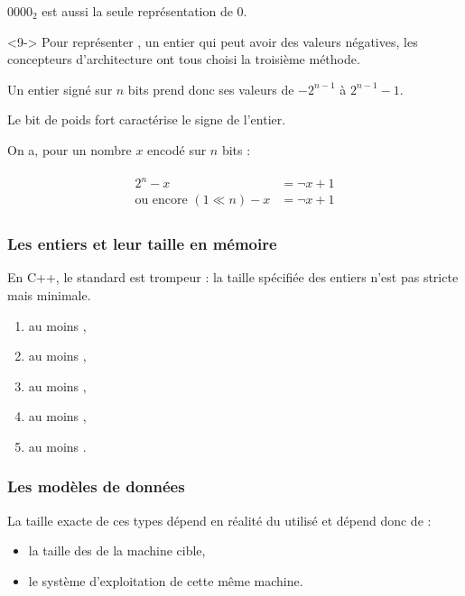 \documentclass{cppcourses}
\begin{document}
\begin{frame}
\begin{enumerate}
\begin{onlyenv}
\( {0000}_2 \) est aussi la seule représentation de 0.
\end{onlyenv}

\end{enumerate}

\begin{onlyenv}<9->
Pour représenter , un entier qui peut avoir des valeurs négatives, les concepteurs d'architecture ont tous choisi la troisième méthode.

Un entier signé sur \( n \) bits prend donc ses valeurs de \( -2^{n - 1} \) à \( 2^{n - 1} - 1\).

Le bit de poids fort caractérise le signe de l'entier.

On a, pour un nombre \( x \) encodé sur \( n \) bits :

\begin{align*}
    \begin{split}
2^n - x &= \lnot x + 1 \\
\text{ou encore } (1 \ll n) - x &= \lnot x + 1
    \end{split}
\end{align*}
\end{onlyenv}

\end{frame}

\begin{frame}

\frametitle{Les entiers et leur taille en mémoire}

En C++, le standard est trompeur : la taille spécifiée des entiers n'est pas stricte mais minimale.


\begin{enumerate}
    \item<2->  au moins ,
    \item<3->  au moins ,
    \item<4->  au moins ,
    \item<5->  au moins ,
    \item<6->  au moins .
\end{enumerate}

\end{frame}

\begin{frame}

\frametitle{Les modèles de données}

La taille exacte de ces types dépend en réalité du  utilisé et dépend donc de :

\begin{itemize}
    \item<2-> la taille des  de la machine cible,
    \item<3-> le système d'exploitation de cette même machine.
\end{itemize}

\end{frame}
\end{document}
